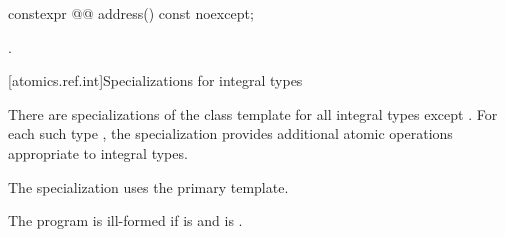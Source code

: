 %
\begin{itemdecl}
constexpr @@ address() const noexcept;
\end{itemdecl}

\begin{itemdescr}
\pnum
\returns
{}.
\end{itemdescr}

[atomics.ref.int]{Specializations for integral types}

\pnum
{}%
There are specializations of the  class template
for all integral types except \cv{} .
For each such type ,
the specialization  provides
additional atomic operations appropriate to integral types.
\begin{note}
The specialization 
uses the primary template.
\end{note}

\pnum
The program is ill-formed
if  is  and
 is .


